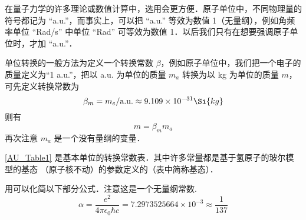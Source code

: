 

在量子力学的许多理论或数值计算中，选用会更方便．原子单位中，不同物理量的符号都记为 “a.u.”，而事实上，可以把 “a.u.” 等效为数值 1（无量纲），例如角频率单位 “Rad/s” 中单位 “Rad” 可等效为数值 1．以后我们只有在想要强调原子单位时，才加 “a.u.”．

单位转换的一般方法为定义一个转换常数 $\beta$，例如原子单位中，我们把一个电子的质量定义为“1 a.u.”，把以 a.u. 为单位的质量 $m_a$ 转换为以 kg 为单位的质量 $m$，可先定义转换常数为
\begin{equation}
\beta_m = m_e/\text{a.u.} \approx 9.109 \times 10^{-31}\Si{kg}
\end{equation}
则有
\begin{equation}
m = \beta_m m_a
\end{equation}
再次注意 $m_a$ 是一个没有量纲的变量．

\autoref{AU_Table1} %
是基本单位的转换常数表．其中许多常量都是基于氢原子的玻尔模型的基态%
（原子核不动）的参数定义的（表中简称基态）．

用可以化简以下部分公式．注意这是一个无量纲常数.
\begin{equation}
\alpha  = \frac{e^2}{4\pi\epsilon_0\hbar c} = 7.2973525664 \times 10^{-3} \approx \frac{1}{137}
\end{equation}

